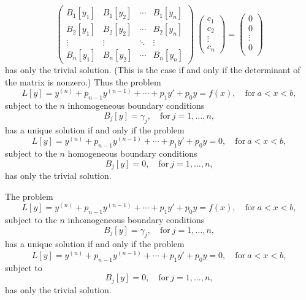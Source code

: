 \[
\begin{pmatrix}
  B_1[y_1] & B_1[y_2] & \cdots & B_1[y_n] \\
  B_2[y_1] & B_2[y_2] & \cdots & B_2[y_n] \\
  \vdots   & \vdots   & \ddots & \vdots   \\
  B_n[y_1] & B_n[y_2] & \cdots & B_n[y_n] 
\end{pmatrix}
\ 
\begin{pmatrix}
  c_1 \\
  c_2 \\
  \vdots \\
  c_n
\end{pmatrix}
=
\begin{pmatrix}
  0 \\
  0 \\
  \vdots \\
  0 \\
\end{pmatrix}
\]
has only the trivial solution.  (This is the case if and only if the 
determinant of the matrix is nonzero.)
Thus the problem
\[
L[y] = y^{(n)} + p_{n-1} y^{(n-1)} + \cdots + p_1 y' + p_0 y = f(x), \quad
\mathrm{for}\ a < x < b,
\]
subject to the $n$ inhomogeneous boundary conditions
\[
B_j[y] = \gamma_j, \quad \mathrm{for}\ j = 1,\ldots,n,
\]
has a unique solution if and only if the problem
\[
L[y] = y^{(n)} + p_{n-1} y^{(n-1)} + \cdots + p_1 y' + p_0 y = 0, \quad
\mathrm{for}\ a < x < b,
\]
subject to the $n$ homogeneous boundary conditions
\[
B_j[y] = 0, \quad \mathrm{for}\ j = 1,\ldots,n,
\]
has only the trivial solution.








\begin{Result}
  \label{ioeostie}
  The problem
  \[
  L[y] = y^{(n)} + p_{n-1} y^{(n-1)} + \cdots + p_1 y' + p_0 y = f(x), \quad
  \mathrm{for}\ a < x < b,
  \]
  subject to the $n$ inhomogeneous boundary conditions
  \[
  B_j[y] = \gamma_j, \quad \mathrm{for}\ j = 1,\ldots,n,
  \]
  has a unique solution if and only if the problem
  \[
  L[y] = y^{(n)} + p_{n-1} y^{(n-1)} + \cdots + p_1 y' + p_0 y = 0, \quad
  \mathrm{for}\ a < x < b,
  \]
  subject to 
  \[
  B_j[y] = 0, \quad \mathrm{for}\ j = 1,\ldots,n,
  \]
  has only the trivial solution.
\end{Result}








